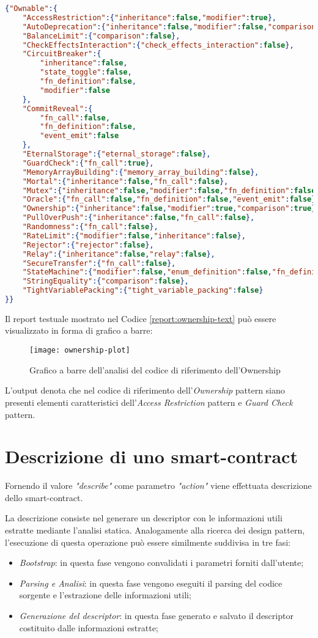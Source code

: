 {\begin{lstlisting}[language=json, caption={Report del codice di riferimento dell'Ownership}, label={report:ownership-text}]
{"Ownable":{
	"AccessRestriction":{"inheritance":false,"modifier":true},
	"AutoDeprecation":{"inheritance":false,"modifier":false,"comparison":false},
	"BalanceLimit":{"comparison":false},
	"CheckEffectsInteraction":{"check_effects_interaction":false},
	"CircuitBreaker":{
		"inheritance":false,
		"state_toggle":false,
		"fn_definition":false,
		"modifier":false
	},
	"CommitReveal":{
		"fn_call":false,
		"fn_definition":false,
		"event_emit":false
	},
	"EternalStorage":{"eternal_storage":false},
	"GuardCheck":{"fn_call":true},
	"MemoryArrayBuilding":{"memory_array_building":false},
	"Mortal":{"inheritance":false,"fn_call":false},
	"Mutex":{"inheritance":false,"modifier":false,"fn_definition":false},
	"Oracle":{"fn_call":false,"fn_definition":false,"event_emit":false},
	"Ownership":{"inheritance":false,"modifier":true,"comparison":true},
	"PullOverPush":{"inheritance":false,"fn_call":false},
	"Randomness":{"fn_call":false},
	"RateLimit":{"modifier":false,"inheritance":false},
	"Rejector":{"rejector":false},
	"Relay":{"inheritance":false,"relay":false},
	"SecureTransfer":{"fn_call":false},
	"StateMachine":{"modifier":false,"enum_definition":false,"fn_definition":false},
	"StringEquality":{"comparison":false},
	"TightVariablePacking":{"tight_variable_packing":false}
}}\end{lstlisting}
Il report testuale mostrato nel Codice \ref{report:ownership-text} può essere visualizzato in forma di grafico a barre:
\begin{figure}[H]
	\centering
	\texttt{[image: ownership-plot]}
	\caption{Grafico a barre dell'analisi del codice di riferimento dell'Ownership}
\end{figure}
\noindent L'output denota che nel codice di riferimento dell'\textit{Ownership} pattern siano presenti elementi caratteristici dell'\textit{Access Restriction} pattern e \textit{Guard Check} pattern.

\section{Descrizione di uno smart-contract}
Fornendo il valore \textit{"describe"} come parametro \textit{"action"} viene effettuata descrizione dello smart-contract. \par
La descrizione consiste nel generare un descriptor con le informazioni utili estratte mediante l'analisi statica. Analogamente alla ricerca dei design pattern, l'esecuzione di questa operazione può essere similmente suddivisa in tre fasi:
\begin{itemize}
	\item \textit{Bootstrap}: in questa fase vengono convalidati i parametri forniti dall'utente;
	\item \textit{Parsing e Analisi}: in questa fase vengono eseguiti il parsing del codice sorgente e l'estrazione delle informazioni utili;
	\item \textit{Generazione del descriptor}: in questa fase generato e salvato il descriptor costituito dalle informazioni estratte;
\end{itemize}

}
